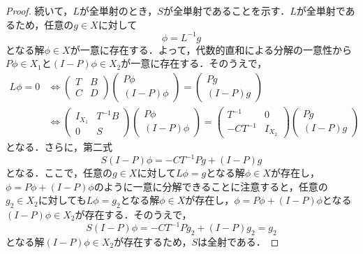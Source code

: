 \documentclass[11pt,a4paper,titlepage]{jsreport}
\theoremstyle{definition}
\begin{document}
\begin{proof}
  続いて，$L$が全単射のとき，$S$が全単射であることを示す．$L$が全単射であるため，任意の$g \in X$に対して
  \begin{equation*}
    \phi = L^{-1}g
  \end{equation*}
  となる解$\phi \in X$が一意に存在する．よって，代数的直和による分解の一意性から$P\phi \in X_1$と$(I-P)\phi \in X_2$が一意に存在する．そのうえで，
  \begin{equation*}
    \begin{split}
      L\phi=0 &\Leftrightarrow
      \begin{pmatrix}
        T & B \\
        C & D
      \end{pmatrix}
      \begin{pmatrix}
        P \phi \\
        (I-P) \phi
      \end{pmatrix}
      =
      \begin{pmatrix}
        Pg \\
        (I-P)g
      \end{pmatrix}
      \\&\Leftrightarrow
      \begin{pmatrix}
        I_{X_1} & T^{-1}B \\
        0 & S
      \end{pmatrix}
      \begin{pmatrix}
        P \phi \\
        (I-P) \phi
      \end{pmatrix}
      =
      \begin{pmatrix}
        T^{-1} & 0 \\
        -CT^{-1} & I_{X_2}
      \end{pmatrix}
      \begin{pmatrix}
        Pg \\
        (I-P)g
      \end{pmatrix}
    \end{split}
  \end{equation*}
  となる．さらに，第二式
  \begin{equation*}
    S(I-P)\phi = -CT^{-1}Pg + (I-P)g
  \end{equation*}
  となる．ここで，任意の$g \in X$に対して$L\phi=g$となる解$\phi \in X$が存在し，$\phi = P\phi + (I-P)\phi$のように一意に分解できることに注意すると，任意の$g_2 \in X_2$に対しても$L\phi=g_2$となる解$\phi \in X$が存在し，$\phi = P\phi + (I-P)\phi$となる$(I-P)\phi \in X_2$が存在する．そのうえで，
  \begin{equation*}
    S(I-P)\phi = -CT^{-1}Pg_2 + (I-P)g_2=g_2
  \end{equation*}
  となる解$(I-P)\phi \in X_2$が存在するため，$S$は全射である．
\end{proof}
 \newpage 
 \newpage 
\end{document}
